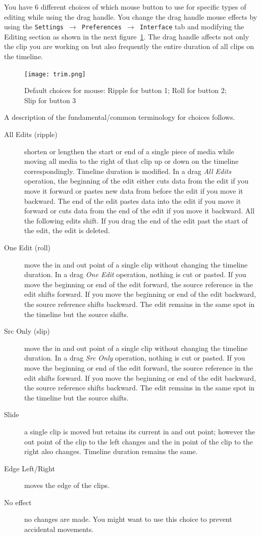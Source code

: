 You have 6 different choices of which mouse button to use for
specific types of editing while using the drag handle.  You change
the drag handle mouse effects by using the \texttt{Settings
  $\rightarrow$ Preferences  $\rightarrow$ Interface} tab and
modifying the Editing section as shown in the next
figure~\ref{fig:trim}. The drag handle affects not only the clip you
are working on but also frequently the entire duration of all clips
on the timeline.

\begin{figure}[htpb]
  \centering
  \texttt{[image: trim.png]}
  \caption{Default choices for mouse: Ripple for button 1; Roll
    for button 2; Slip for button 3}
  \label{fig:trim}
\end{figure}

A description of the fundamental/common terminology for choices
follows.

\begin{description}
\item[All Edits (ripple)] shorten or lengthen the start or end
  of a single piece of media while moving all media to the right of
  that clip up or down on the timeline correspondingly.  Timeline
  duration is modified.  In a drag \textit{All Edits} operation, the
  beginning of the edit either cuts data from the edit if you move it
  forward or pastes new data from before the edit if you move it
  backward. The end of the edit pastes data into the edit if you move
  it forward or cuts data from the end of the edit if you move it
  backward. All the following edits shift. If you drag the end of the
  edit past the start of the edit, the edit is deleted.
\item[One Edit (roll)] move the in and out point of a single
  clip without changing the timeline duration. In a drag \textit{One
    Edit} operation, nothing is cut or pasted. If you move the beginning
  or end of the edit forward, the source reference in the edit shifts
  forward. If you move the beginning or end of the edit backward, the
  source reference shifts backward. The edit remains in the same spot
  in the timeline but the source shifts.
\item[Src Only (slip)] move the in and out point of a single
  clip without changing the timeline duration. In a drag \textit{Src
    Only} operation, nothing is cut or pasted. If you move the beginning
  or end of the edit forward, the source reference in the edit shifts
  forward. If you move the beginning or end of the edit backward, the
  source reference shifts backward. The edit remains in the same spot
  in the timeline but the source shifts.
\item[Slide] a single clip is moved but retains its current in
  and out point; however the out point of the clip to the left changes
  and the in point of the clip to the right also changes.  Timeline
  duration remains the same.
\item[Edge Left/Right] moves the edge of the clips.
\item[No effect] no changes are made.  You might want to use
  this choice to prevent accidental movements.
\end{description}

